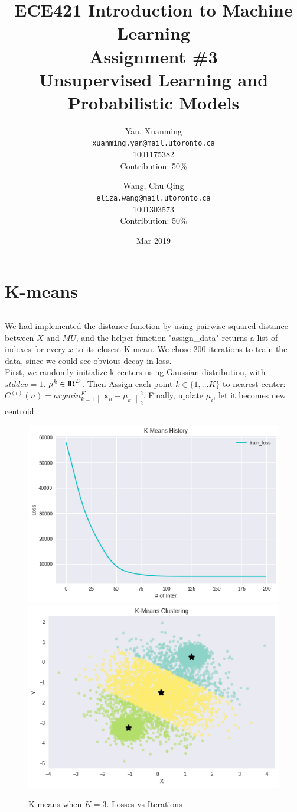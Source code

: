 \documentclass[10pt,letterpaper]{article}
\title{ECE421 Introduction to Machine Learning \\
    Assignment \#3 \\
    Unsupervised Learning and Probabilistic Models}
\date{Mar 2019}
\author{
  Yan, Xuanming\\
  \texttt{xuanming.yan@mail.utoronto.ca} \\
  1001175382 \\
  Contribution: 50\%
  \and
  Wang, Chu Qing\\
  \texttt{eliza.wang@mail.utoronto.ca} \\
  1001303573\\
  Contribution: 50\%
} %
\begin{document}


\maketitle %

\section{K-means}


\subsection{}
\qquad We had implemented the distance function by using pairwise squared distance between $X$ and $MU$, and the helper function "assign\_data" returns a list of indexes for every $x$ to its closest K-mean. We chose $200$ iterations to train the data, since we could see obvious decay in loss.\\

First, we randomly initialize k centers using Gaussian distribution, with $stddev = 1$. $ \mu^{k} \in {\rm I\!R}^{D} $. Then Assign each point $k \in \{1,…K\}$ to nearest center: $C^{(t)}(n) = argmin _{k = 1}^{K}\left\| \textbf{x}_n - \mu_{k} \right\|_2^2$. Finally, update $\mu_i$, let it becomes new centroid. 
\begin{figure}[H]
\centering

  \includegraphics[width=.42\linewidth]{imgs/download.png}
  \includegraphics[width=.42\linewidth]{imgs/p1_1_2.png}
  \caption{K-means when $K=3$. Losses vs Iterations}

\end{figure}
\end{document}
